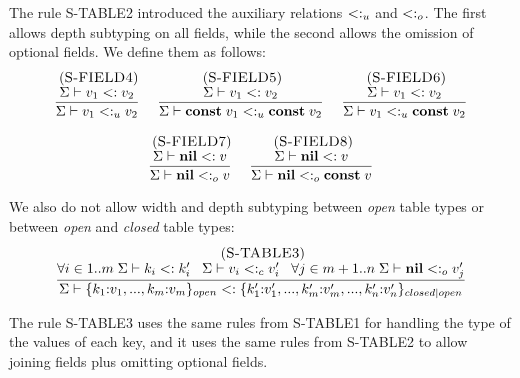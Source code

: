 The rule \textsc{S-TABLE2} introduced the auxiliary relations
$<:_{u}$ and $<:_{o}$.
The first allows depth subtyping on all fields,
while the second allows the omission of optional fields.
We define them as follows:
\[
\begin{array}{c}
\begin{array}{c}
\; (\textsc{S-FIELD4})\\
\dfrac{\Sigma \vdash v_{1} <: v_{2}}
      {\Sigma \vdash v_{1} <:_{u} v_{2}}
\end{array}
\;
\begin{array}{c}
\; (\textsc{S-FIELD5})\\
\dfrac{\Sigma \vdash v_{1} <: v_{2}}
      {\Sigma \vdash \mathbf{const} \; v_{1} <:_{u} \mathbf{const} \; v_{2}}
\end{array}
\;
\begin{array}{c}
\; (\textsc{S-FIELD6})\\
\dfrac{\Sigma \vdash v_{1} <: v_{2}}
      {\Sigma \vdash v_{1} <:_{u} \mathbf{const} \; v_{2}}
\end{array}
\\ \\
\begin{array}{c}
\; (\textsc{S-FIELD7})\\
\dfrac{\Sigma \vdash \mathbf{nil} <: v}
      {\Sigma \vdash \mathbf{nil} <:_{o} v}
\end{array}
\;
\begin{array}{c}
\; (\textsc{S-FIELD8})\\
\dfrac{\Sigma \vdash \mathbf{nil} <: v}
      {\Sigma \vdash \mathbf{nil} <:_{o} \mathbf{const} \; v}
\end{array}
\end{array}
\]

We also do not allow width and depth subtyping between \emph{open}
table types or between \emph{open} and \emph{closed} table types:
\[
\begin{array}{c}
\; (\textsc{S-TABLE3})\\
\dfrac{\forall i \in 1..m \; \Sigma \vdash k_{i} <: k_{i}' \;\;\;
       \Sigma \vdash v_{i} <:_{c} v_{i}' \;\;\;
       \forall j \in m+1..n \; \Sigma \vdash \mathbf{nil} <:_{o} v_{j}'}
      {\Sigma \vdash \{k_{1}{:}v_{1}, ..., k_{m}{:}v_{m}\}_{open} <:
                    \{k_{1}'{:}v_{1}', ..., k_{m}'{:}v_{m}', ..., k_{n}'{:}v_{n}'\}_{closed|open}}
\end{array}
\]

The rule \textsc{S-TABLE3} uses the same rules from
\textsc{S-TABLE1} for handling the type of the values of each key, and
it uses the same rules from \textsc{S-TABLE2} to allow joining fields plus
omitting optional fields.

